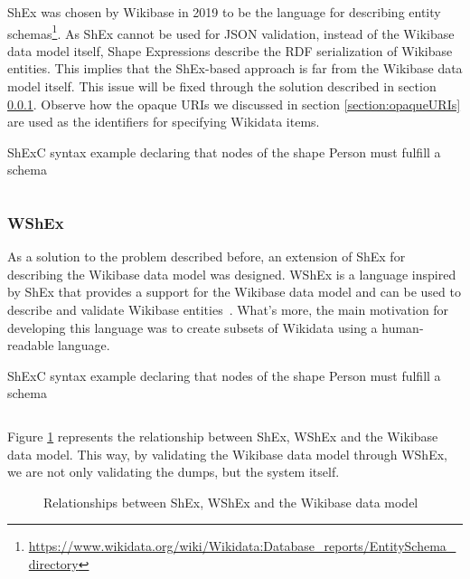 ShEx was chosen by Wikibase in 2019 to be the language for describing entity schemas\footnote{\url{https://www.wikidata.org/wiki/Wikidata:Database_reports/EntitySchema_directory}}. As ShEx cannot be used for JSON validation, instead of the Wikibase data model itself, Shape Expressions describe the RDF serialization of Wikibase entities. This implies that the ShEx-based approach is far from the Wikibase data model itself. This issue will be fixed through the solution described in section \ref{section:WShEx}. Observe how the opaque URIs we discussed in section \ref{section:opaqueURIs} are used as the identifiers for specifying Wikidata items.

\begin{code}
    \caption{ShExC syntax example declaring that nodes of the shape Person must fulfill a schema}
    \inputminted{shex}{listings/wikibase.shex}
\end{code}

\subsubsection{WShEx}
\label{section:WShEx}

As a solution to the problem described before, an extension of ShEx for describing the Wikibase data model was designed. WShEx is a language inspired by ShEx that provides a support for the Wikibase data model and can be used to describe and validate Wikibase entities~\cite{https://doi.org/10.48550/arxiv.2208.02697}. What's more, the main motivation for developing this language was to create subsets of Wikidata using a human-readable language.

\begin{code}
    \caption{ShExC syntax example declaring that nodes of the shape Person must fulfill a schema}
    \inputminted{shex}{listings/wshex.shex}
\end{code}

Figure \ref{fig:WShEx} represents the relationship between ShEx, WShEx and the Wikibase data model. This way, by validating the Wikibase data model through WShEx, we are not only validating the dumps, but the system itself.

\begin{figure}[ht]
    \centering
    
    \caption[Relationships between ShEx, WShEx and the Wikibase data model]{Relationships between ShEx, WShEx and the Wikibase data model~\cite{https://doi.org/10.48550/arxiv.2110.11709}}
    \label{fig:WShEx}
\end{figure}

